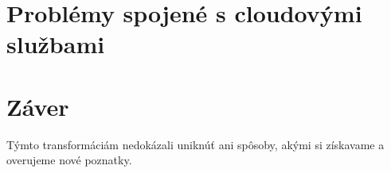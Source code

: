 \documentclass[10pt,slovak,a4paper]{article}%
\begin{document}
\section{Problémy spojené s cloudovými službami}


\section{Záver}


Týmto transformáciám nedokázali uniknúť ani spôsoby, akými si získavame a overujeme nové poznatky.





\end{document}
